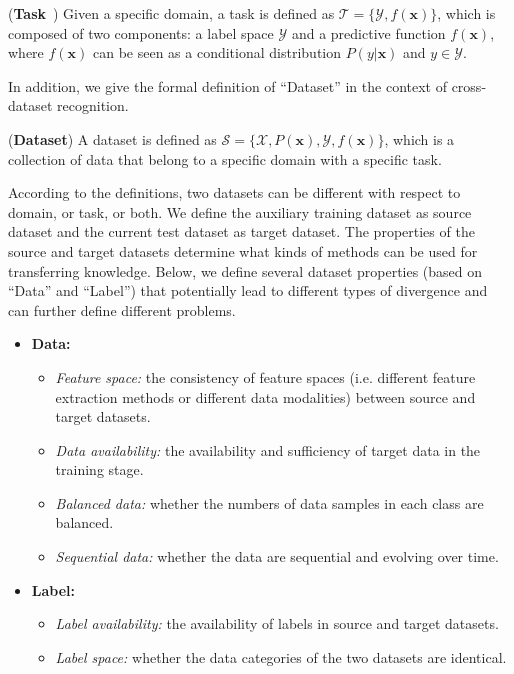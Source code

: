 \documentclass[prodmode]{acmsmall}  %
\begin{document}
\begin{definition}(\textbf{Task}~\cite{Pan2010}) Given a specific domain, a task is defined as $\mathcal{T} = \{\mathcal{Y},f(\mathbf{x})\}$, which is composed of two components: a label space $\mathcal{Y}$ and a predictive function $f(\mathbf{x})$, where $f(\mathbf{x})$ can be seen as a conditional distribution $P(y|\mathbf{x})$ and $y\in{\mathcal{Y}}$.  \end{definition}

 In addition, we give the formal definition of ``Dataset'' in the context of cross-dataset recognition. 
\begin{definition}(\textbf{Dataset}) A dataset is defined as $\mathcal{S} = \{\mathcal{X},P(\mathbf{x}),\mathcal{Y},f(\mathbf{x})\}$, which is a collection of data that belong to a specific domain with a specific task.
\end{definition}

According to the definitions, two datasets can be different with respect to domain, or task, or both. We define the auxiliary training dataset as source dataset and the current test dataset as target dataset. The properties of the source and target datasets determine what kinds of methods can be used for transferring knowledge. Below, we define several dataset properties (based on ``Data'' and ``Label'') that potentially lead to different types of divergence and can further define different problems.
\begin{itemize}
\item \textbf{Data:} 
	\begin{itemize}
	\item \textit{Feature space:} the consistency of feature spaces (i.e. different feature extraction methods or different data modalities) between source and target datasets.
	\item \textit{Data availability:} the availability and sufficiency of target data in the training stage.
	\item \textit{Balanced data:} whether the numbers of data samples in each class are balanced.
	\item \textit{Sequential data:} whether the data are sequential and evolving over time.
	\end{itemize}
\item \textbf{Label:}
	\begin{itemize}
	\item \textit{Label availability:} the availability of labels in source and target datasets.
	\item \textit{Label space:} whether the data categories of the two datasets are identical.
	\end{itemize}		
\end{itemize}
\end{document}
